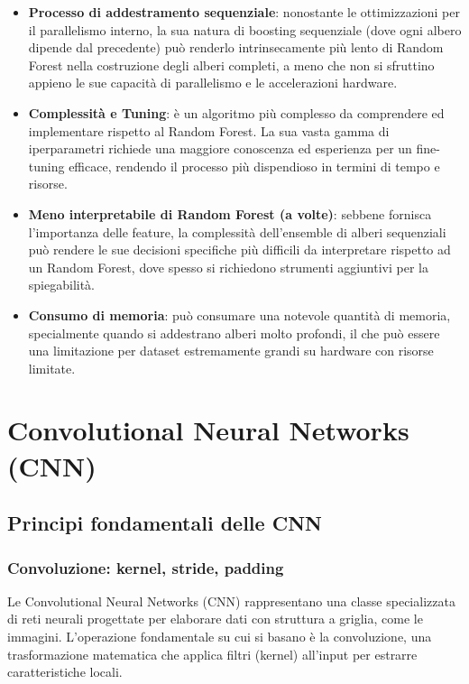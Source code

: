\documentclass[a4paper,12pt]{report}
\begin{document}
	\begin{itemize}
		\item \textbf{Processo di addestramento sequenziale}: nonostante le ottimizzazioni per il parallelismo interno, la sua natura di boosting sequenziale (dove ogni albero dipende dal precedente) può renderlo intrinsecamente più lento di Random Forest nella costruzione degli alberi completi, a meno che non si sfruttino appieno le sue capacità di parallelismo e le accelerazioni hardware.
		\item \textbf{Complessità e Tuning}: è un algoritmo più complesso da comprendere ed implementare rispetto al Random Forest. La sua vasta gamma di iperparametri richiede una maggiore conoscenza ed esperienza per un fine-tuning efficace, rendendo il processo più dispendioso in termini di tempo e risorse.
		\item \textbf{Meno interpretabile di Random Forest (a volte)}: sebbene fornisca l'importanza delle feature, la complessità dell'ensemble di alberi sequenziali può rendere le sue decisioni specifiche più difficili da interpretare rispetto ad un Random Forest, dove spesso si richiedono strumenti aggiuntivi per la spiegabilità.
		\item \textbf{Consumo di memoria}: può consumare una notevole quantità di memoria, specialmente quando si addestrano alberi molto profondi, il che può essere una limitazione per dataset estremamente grandi su hardware con risorse limitate.
	\end{itemize}
	
	\chapter{Convolutional Neural Networks (CNN)}
	
	\section{Principi fondamentali delle CNN}
	
	\subsection{Convoluzione: kernel, stride, padding}
	Le Convolutional Neural Networks (CNN) rappresentano una classe specializzata di reti neurali progettate per elaborare dati con struttura a griglia, come le immagini. L'operazione fondamentale su cui si basano è la convoluzione, una trasformazione matematica che applica filtri (kernel) all'input per estrarre caratteristiche locali.
	
\end{document}
